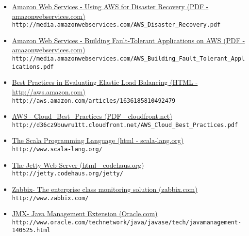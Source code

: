 \begin{itemize}
\item \href{http://media.amazonwebservices.com/AWS_Disaster_Recovery.pdf}{Amazon
Web Services - Using AWS for Disaster Recovery (PDF - amazonwebservices.com)}\\
\verb?http://media.amazonwebservices.com/AWS_Disaster_Recovery.pdf?\\

\item \href{http://media.amazonwebservices.com/AWS_Building_Fault_Tolerant_Applications.pdf}{Amazon
Web Services - Building Fault-Tolerant Applications on AWS (PDF - amazonwebservices.com)}\\
\verb?http://media.amazonwebservices.com/AWS_Building_Fault_Tolerant_Applications.pdf?\\

\item \href{http://aws.amazon.com/articles/1636185810492479}{Best Practices in
Evaluating Elastic Load Balancing (HTML - http://aws.amazon.com)}\\
\verb?http://aws.amazon.com/articles/1636185810492479?\\

\item \href{http://d36cz9buwru1tt.cloudfront.net/AWS_Cloud_Best_Practices.pdf}{AWS
- Cloud\_Best\_Practices (PDF - cloudfront.net)}\\
\verb?http://d36cz9buwru1tt.cloudfront.net/AWS_Cloud_Best_Practices.pdf?\\

\item \href{http://www.scala-lang.org/}{The Scala Programming Language (html - scala-lang.org)}\\
\verb?http://www.scala-lang.org/?\\

\item \href{http://jetty.codehaus.org/jetty/}{The Jetty Web Server (html - codehaus.org)}\\
\verb?http://jetty.codehaus.org/jetty/?\\

\item \href{http://www.zabbix.com/}{Zabbix- The enterprise class monitoring solution (zabbix.com)}\\
\verb?http://www.zabbix.com/?\\

\item \href{http://www.oracle.com/technetwork/java/javase/tech/javamanagement-140525.html}{JMX- Java Management Extension (Oracle.com)}\\
\verb?http://www.oracle.com/technetwork/java/javase/tech/javamanagement-140525.html?\\


\end{itemize}
